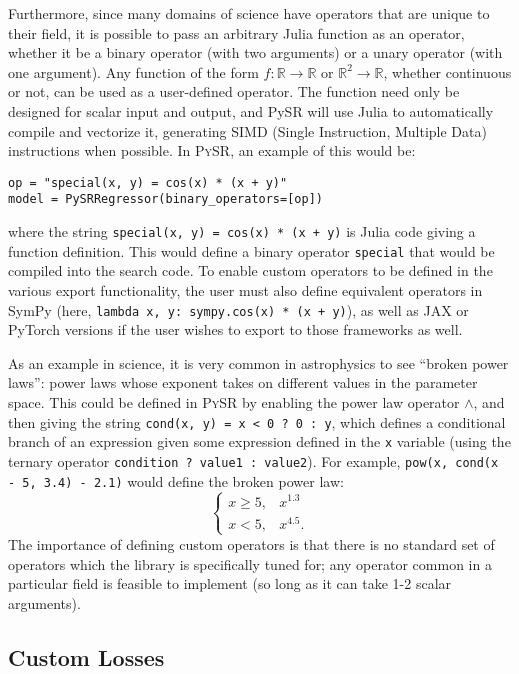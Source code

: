 \documentclass[letterpaper,twocolumn]{scrartcl}
\newcommand\pysr{\textsc{PySR}\xspace}
\begin{document}
Furthermore, since many domains of science have operators that are unique to their field, it is possible to pass an arbitrary Julia function as an operator, whether it be a binary operator (with two arguments) or a unary operator (with one argument).
Any function of the form
$f:\mathbb{R}\rightarrow \mathbb{R}$ or $\mathbb{R}^2\rightarrow\mathbb{R}$, whether
continuous or not,
can be used as a user-defined operator.
The function need only be designed for scalar input and output, and PySR will use Julia to automatically compile and vectorize it, generating SIMD (Single Instruction, Multiple Data) instructions when possible.
In \pysr, an example of this would be:
\begin{minipage}{0.95\linewidth}
\begin{verbatim}
op = "special(x, y) = cos(x) * (x + y)"
model = PySRRegressor(binary_operators=[op])
\end{verbatim}
\end{minipage}
where the string \texttt{special(x, y) = cos(x) * (x + y)} is Julia code giving a function definition.
This would define a binary operator \texttt{special} that would be compiled into the search code.
To enable custom operators to be defined in the various export functionality, the user must also define equivalent operators in SymPy (here, \texttt{lambda x, y: sympy.cos(x) * (x + y)}), as well as JAX or PyTorch versions if the user wishes to export to those frameworks as well.

As an example in science, it is very common in astrophysics to see ``broken power laws'': power laws whose exponent takes on different values in the parameter space.
This could be defined in \pysr by enabling the power law operator $\wedge$, and then giving the string \texttt{cond(x, y) = x < 0 ? 0 : y}, which defines a conditional branch of an expression given some expression defined in the \texttt{x} variable (using the ternary operator \texttt{condition ? value1 : value2}).
For example, \texttt{pow(x, cond(x - 5, 3.4) - 2.1)} would define the broken power law:
$$
\left\{
\begin{array}{cr}
x \geq 5, & x^{1.3}\\
x < 5, & x^{4.5}.
\end{array}
\right.
$$
The importance of defining custom operators is that there is no standard set of operators which the library is specifically tuned for; any operator common in a particular field is feasible to implement (so long as it can take 1-2 scalar arguments).


\subsection{Custom Losses}
\label{sec:custom_losses}
\end{document}

